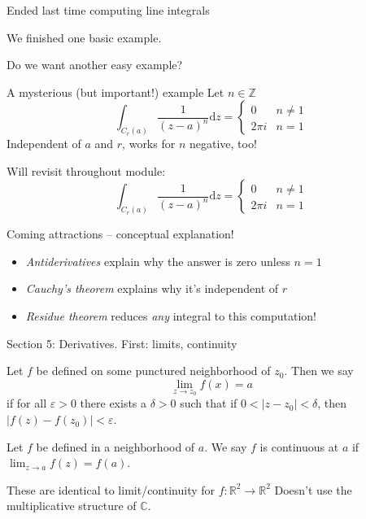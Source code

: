 \documentclass{beamer}
\newcommand{\C}{\mathbb{C}}
\newcommand{\Z}{\mathbb{Z}}
\newcommand{\R}{\mathbb{R}}
\begin{document}
\begin{frame}{Ended last time computing line integrals}

  We finished one basic example.

  \begin{block}{Do we want another easy example?}
    \end{block}
  

\begin{block}{A mysterious (but important!) example}
Let $n\in\Z$
$$\int_{C_r(a)}\frac{1}{(z-a)^n}\text{d}z=\begin{cases} 0 & n\neq 1 \\ 2\pi i & n=1\end{cases}$$
Independent of $a$ and $r$, works for $n$ negative, too!
\end{block}

\end{frame}

\begin{frame}{Will revisit throughout module:}
$$\int_{C_r(a)}\frac{1}{(z-a)^n}\text{d}z=\begin{cases} 0 & n\neq 1 \\ 2\pi i & n=1\end{cases}$$
\begin{block}{Coming attractions -- conceptual explanation!}
\begin{itemize}
    \item \emph{Antiderivatives} explain why the answer is zero unless $n=1$
    \item \emph{Cauchy's theorem} explains why it's independent of $r$
    \item \emph{Residue theorem} reduces \emph{any} integral to this computation!
\end{itemize}
\end{block}

\end{frame}

\begin{frame}{Section 5: Derivatives.  First: limits, continuity}

\begin{definition}[Limits]Let $f$ be defined on some punctured neighborhood of $z_0$.
Then we say
$$\lim_{z\to z_0} f(x)=a$$
if for all $\varepsilon>0$ there exists a $\delta>0$ such that if $0<|z-z_0|<\delta$, then $|f(z)-f(z_0)|<\varepsilon$.
\end{definition}

\begin{definition}[Continuous]Let $f$ be defined in a neighborhood of $a$.  We say $f$ is continuous at $a$ if $\lim_{z\to a}f(z)=f(a)$.
\end{definition}



\begin{block}{These are identical to limit/continuity for $f:\R^2\to\R^2$}
Doesn't use the multiplicative structure of $\C$.
\end{block}
\end{frame}
\end{document}

